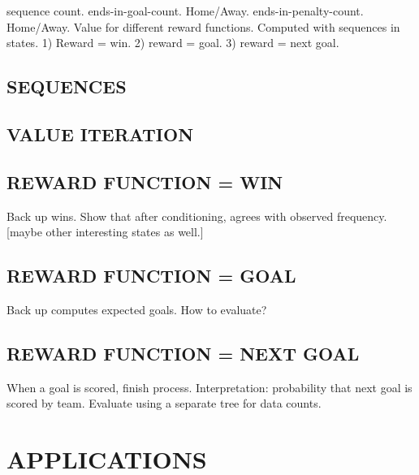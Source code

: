 \documentclass[]{article}
\begin{document}
sequence count.
ends-in-goal-count. Home/Away.
ends-in-penalty-count. Home/Away.
Value for different reward functions. Computed with sequences in states.
1) Reward = win. 2) reward = goal. 3) reward = next goal.


\subsection{SEQUENCES}


\subsection{VALUE ITERATION}

\subsection{REWARD FUNCTION = WIN}

Back up wins. Show that after conditioning, agrees with observed frequency. [maybe other interesting states as well.]

\subsection{REWARD FUNCTION = GOAL}

Back up computes expected goals. How to evaluate?

\subsection{REWARD FUNCTION = NEXT GOAL}

When a goal is scored, finish process. Interpretation: probability that next goal is scored by team. Evaluate using a separate tree for data counts.

\section{APPLICATIONS}




\end{document}
